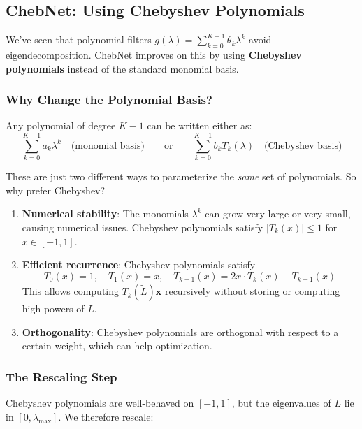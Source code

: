 \begin{notechapter}
\subsection{ChebNet: Using Chebyshev Polynomials}

We've seen that polynomial filters $g(\lambda) = \sum_{k=0}^{K-1} 
\theta_k \lambda^k$ avoid eigendecomposition. ChebNet \cite{dft-to-gnn:defferrard2016convolutional} improves on this 
by using \textbf{Chebyshev polynomials} instead of the standard monomial 
basis.

\subsubsection{Why Change the Polynomial Basis?}

Any polynomial of degree $K-1$ can be written either as:
\[
\sum_{k=0}^{K-1} a_k \lambda^k \quad \text{(monomial basis)}
\qquad \text{or} \qquad
\sum_{k=0}^{K-1} b_k T_k(\lambda) \quad \text{(Chebyshev basis)}
\]

These are just two different ways to parameterize the \emph{same} set 
of polynomials. So why prefer Chebyshev?

\begin{enumerate}
\item \textbf{Numerical stability}: The monomials $\lambda^k$ can grow 
      very large or very small, causing numerical issues. Chebyshev 
      polynomials satisfy $|T_k(x)| \leq 1$ for $x \in [-1, 1]$.

\item \textbf{Efficient recurrence}: Chebyshev polynomials satisfy
      \[
      T_0(x) = 1, \quad T_1(x) = x, \quad 
      T_{k+1}(x) = 2x \cdot T_k(x) - T_{k-1}(x)
      \]
      This allows computing $T_k(\tilde{L})\mathbf{x}$ recursively without 
      storing or computing high powers of $L$.

\item \textbf{Orthogonality}: Chebyshev polynomials are orthogonal 
      with respect to a certain weight, which can help optimization.
\end{enumerate}

\subsubsection{The Rescaling Step}

Chebyshev polynomials are well-behaved on $[-1, 1]$, but the eigenvalues 
of $L$ lie in $[0, \lambda_{\max}]$. We therefore rescale:


\end{notechapter}
